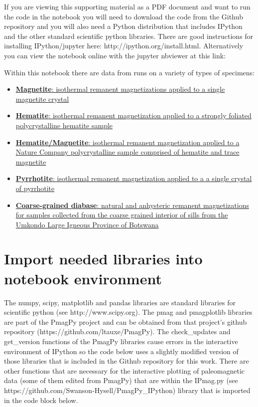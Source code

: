 \documentclass{article}
\begin{document}
If you are viewing this supporting material as a PDF document and want
to run the code in the notebook you will need to download the code from
the Github repository and you will also need a Python distribution that
includes IPython and the other standard scientific python libraries.
There are good instructions for installing IPython/jupyter here:
http://ipython.org/install.html. Alternatively you can view the notebook
online with the jupyter nbviewer at this link:

Within this notebook there are data from runs on a variety of types of
specimens:

\begin{itemize}
\itemsep1pt\parskip0pt
\item
  \hyperref[Single-crystal-magnetite-experiments]{\textbf{Magnetite}:
  isothermal remanent magnetizations applied to a single magnetite
  crystal}
\item
  \hyperref[Polycrystalline-hematite-experiments]{\textbf{Hematite}:
  isothermal remanent magnetization applied to a strongly foliated
  polycrystalline hematite sample}
\item
  \hyperref[Polycrystalline-magnetite-and-hematite-experiments]{\textbf{Hematite/Magnetite}:
  isothermal remanent magnetization applied to a Nature Company
  polycrystalline sample comprised of hematite and trace magnetite}
\item
  \hyperref[Single-crystal-pyrrhotite-experiments]{\textbf{Pyrrhotite}:
  isothermal remanent magnetization applied to a a single crystal of
  pyrrhotite}
\item
  \hyperref[Umkondo-Largeux5cux2520Igneous-Province-sill-experiments]{\textbf{Coarse-grained
  diabase}: natural and anhysteric remanent magnetizations for samples
  collected from the coarse grained interior of sills from the Umkondo
  Large Igneous Province of Botswana}
\end{itemize}


    \section{Import needed libraries into notebook environment}


    The numpy, scipy, matplotlib and pandas libraries are standard libraries
for scientific python (see http://www.scipy.org). The pmag and
pmagplotlib libraries are part of the PmagPy project and can be obtained
from that project's github repository
(https://github.com/ltauxe/PmagPy). The check\_updates and get\_version
functions of the PmagPy libraries cause errors in the interactive
environment of IPython so the code below uses a slightly modified
version of those libraries that is included in the Github repository for
this work. There are other functions that are necessary for the
interactive plotting of paleomagnetic data (some of them edited from
PmagPy) that are within the IPmag.py (see
https://github.com/Swanson-Hysell/PmagPy\_IPython) library that is
imported in the code block below.
\end{document}
